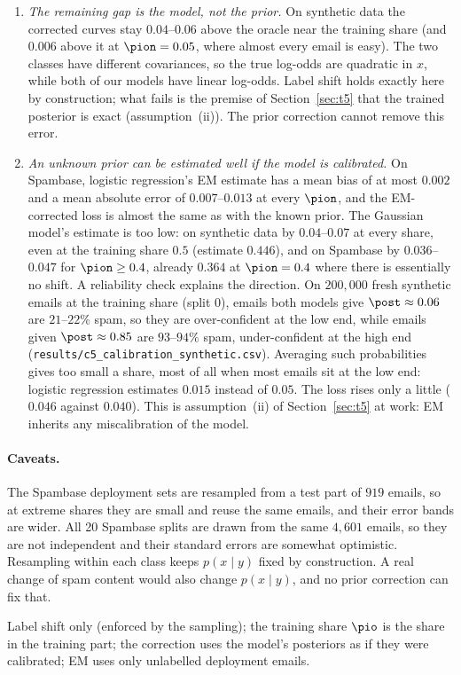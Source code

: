 \begin{enumerate}[itemsep=2pt,topsep=2pt]
        not the error count.
  \item \emph{The remaining gap is the model, not the prior.} On synthetic data the corrected curves stay
        $0.04$--$0.06$ above the oracle near the training share (and $0.006$ above it at $\pion=0.05$, where
        almost every email is easy). The two classes have different covariances,
        so the true log-odds are quadratic in $x$, while both of our models have linear log-odds. Label shift
        holds exactly here by construction; what fails is the premise of Section~\ref{sec:t5} that the trained
        posterior is exact (assumption~(ii)). The prior correction cannot remove this error.
  \item \emph{An unknown prior can be estimated well if the model is calibrated.} On Spambase, logistic
        regression's EM estimate has a mean bias of at most $0.002$ and a mean absolute error of $0.007$--$0.013$
        at every $\pion$, and the EM-corrected loss is almost the same as with the known prior. The Gaussian model's
        estimate is too low: on synthetic data by $0.04$--$0.07$ at every share, even at the training share $0.5$
        (estimate $0.446$), and on Spambase by $0.036$--$0.047$ for $\pion\ge0.4$, already $0.364$ at
        $\pion=0.4$ where there is essentially no shift. A reliability check explains the direction. On
        $200{,}000$ fresh synthetic emails at the training share (split $0$), emails both models give
        $\post\approx0.06$ are $21$--$22\%$ spam, so they are over-confident at the low end, while emails given
        $\post\approx0.85$ are $93$--$94\%$ spam, under-confident at the high end
        (\texttt{results/c5\_calibration\_synthetic.csv}). Averaging such probabilities gives too small a share,
        most of all when most emails sit at the low end: logistic regression estimates $0.015$ instead of $0.05$.
        The loss rises only a little ($0.046$ against $0.040$). This is assumption~(ii) of Section~\ref{sec:t5}
        at work: EM inherits any miscalibration of the model.
\end{enumerate}

\paragraph{Caveats.}
The Spambase deployment sets are resampled from a test part of $919$ emails, so at extreme shares they are
small and reuse the same emails, and their error bands are wider. All 20 Spambase splits are drawn from
the same $4{,}601$ emails, so they are not independent and their standard errors are somewhat optimistic.
Resampling within each class keeps
$p(x\mid y)$ fixed by construction. A real change of spam content would also change $p(x\mid y)$, and no
prior correction can fix that.

\begin{assumptions}
Label shift only (enforced by the sampling); the training share $\pio$ is the share in the training part;
the correction uses the model's posteriors as if they were calibrated; EM uses only unlabelled deployment emails.
\end{assumptions}
